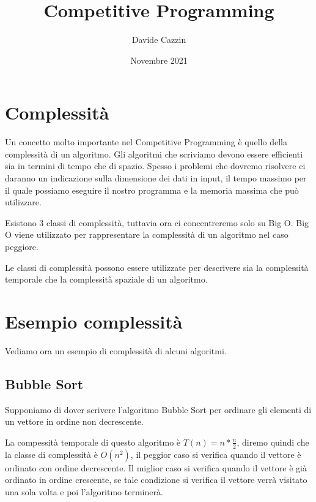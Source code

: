 \documentclass{article}
\title{Competitive Programming}
\author{Davide Cazzin}
\date{Novembre 2021}
\begin{document}
\maketitle

\section{Complessità}

Un concetto molto importante nel Competitive Programming è quello della complessità di un algoritmo. Gli algoritmi che scriviamo devono essere efficienti sia in termini di tempo che di spazio. 
Spesso i problemi che dovremo risolvere ci daranno un indicazione sulla dimensione dei dati in input, il tempo massimo per il quale possiamo eseguire il nostro programma e la memoria massima che può utilizzare.

Esistono 3 classi di complessità, tuttavia ora ci concentreremo solo su Big O. Big O viene utilizzato per rappresentare la complessità di un algoritmo nel caso peggiore.

Le classi di complessità possono essere utilizzate per descrivere sia la complessità temporale che la complessità spaziale di un algoritmo.

\section{Esempio complessità}

Vediamo ora un esempio di complessità di alcuni algoritmi.



\subsection{Bubble Sort}

Supponiamo di dover scrivere l'algoritmo Bubble Sort per ordinare gli elementi di un vettore in ordine non decrescente.



La compessità temporale di questo algoritmo è $T(n) = n * \frac{n}{2}$, diremo quindi che la classe di complessità è $O(n^2)$, il peggior caso si verifica quando il vettore è ordinato con ordine decrescente. Il miglior caso si verifica quando il vettore è già ordinato in ordine crescente, se tale condizione si verifica il vettore verrà visitato una sola volta e poi l'algoritmo terminerà.
\end{document}
